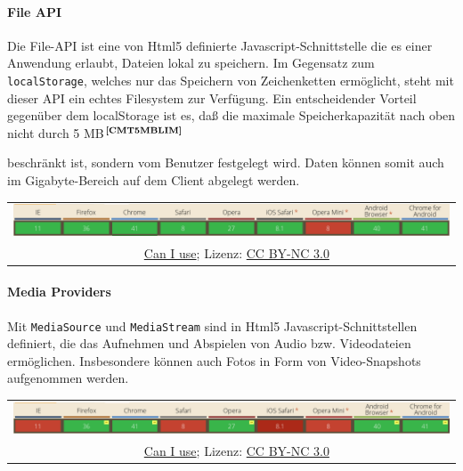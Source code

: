 \paragraph{File API}
Die File-API ist eine von Html5 definierte Javascript-Schnittstelle die es einer Anwendung erlaubt, Dateien lokal zu speichern. Im Gegensatz zum \texttt{localStorage}, welches nur das Speichern von Zeichenketten ermöglicht, steht mit dieser API ein echtes Filesystem zur Verfügung. Ein entscheidender Vorteil gegenüber dem localStorage ist es, daß die maximale Speicherkapazität nach oben nicht durch 5 MB$^{\textbf{\ref{CMT5MBLIM}}}$%
\addtocounter{footnote}{1}%
 beschränkt ist, sondern vom Benutzer festgelegt wird. Daten können somit auch im Gigabyte-Bereich auf dem Client abgelegt werden.
	\begin{table}[H]
  		\begin{adjustwidth}{-1.5cm}{1.5cm}
		\centering
		\begin{tabulary}{20cm}{C}
          	\includegraphics[scale=0.6]{bilder/screenshots/caniuse_fileapi.png}\\ 
				\ccLogo\ 
				\begingroup
    				\fontsize{8pt}{12pt}\selectfont
    				\href{http://caniuse.com/\#search=file\%20api}{Can I use}; Lizenz: \href{http://creativecommons.org/licenses/by-nc/3.0/}{CC BY-NC 3.0} 
				\endgroup
		\end{tabulary}
  		\end{adjustwidth}
	\end{table}

\paragraph{Media Providers}
Mit \texttt{MediaSource} und \texttt{MediaStream} sind in Html5 Javascript-Schnittstellen definiert, die das Aufnehmen und Abspielen von Audio bzw. Videodateien ermöglichen. Insbesondere können auch Fotos in Form von Video-Snapshots aufgenommen werden.
	\begin{table}[H]
  		\begin{adjustwidth}{-1.5cm}{1.5cm}
		\centering
		\begin{tabulary}{20cm}{C}
          	\includegraphics[scale=0.6]{bilder/screenshots/caniuse_mediastream.png}\\ 
				\ccLogo\ 
				\begingroup
    				\fontsize{8pt}{12pt}\selectfont
    				\href{http://caniuse.com/\#search=Media\%20Stream}{Can I use}; Lizenz: \href{http://creativecommons.org/licenses/by-nc/3.0/}{CC BY-NC 3.0} 
				\endgroup
		\end{tabulary}
  		\end{adjustwidth}
	\end{table}

